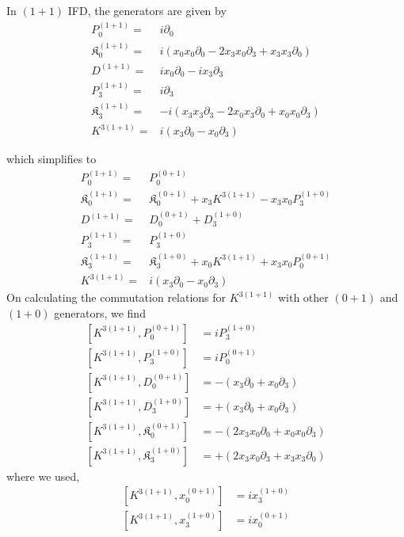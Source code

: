 \documentclass[]{article}
\numberwithin{equation}{section}
\begin{document}
{{In  $(1+1)$ IFD, the generators are given by
\begin{align}
    P^{(1+1)}_{0}=&i\partial_{0}\\
    \mathfrak{K}^{(1+1)}_{{0}}=&i(x_{0}x_{0}\partial_{{0}}-2x_{3}x_{0}\partial_{3}+x_{3}x_{3}\partial_{0})\\
    D^{(1+1)}=&ix_{0}\partial_{0}-ix_{3}\partial_{3}\\
    P^{(1+1)}_{3}=&i\partial_{3}\\
    \mathfrak{K}^{(1+1)}_{{3}}=&-i(x_{3}x_{3}\partial_{{3}}-2x_{0}x_{3}\partial_{0}+x_{0}x_{0}\partial_{3})\\
    K^{3(1+1)}=&i(x_{3}\partial_{0}-x_{0}\partial_{3})
\end{align}

which simplifies to
\begin{align}
    P^{(1+1)}_{0}=&P^{(0+1)}_{0}\\
    \mathfrak{K}^{(1+1)}_{{0}}=&\mathfrak{K}^{(0+1)}_{{0}}+x_{3}K^{3(1+1)}-x_{3}x_{0}P^{(1+0)}_{3}\\
    D^{(1+1)}=&D^{(0+1)}_{0}+D^{(1+0)}_{3}\\
    P^{(1+1)}_{3}=&P^{(1+0)}_{3}\\
    \mathfrak{K}^{(1+1)}_{{3}}=&\mathfrak{K}^{(1+0)}_{{3}}+x_{0}K^{3(1+1)}+x_{3}x_{0}P^{(0+1)}_{0}\\
    K^{3(1+1)}=&i(x_{3}\partial_{0}-x_{0}\partial_{3})
\end{align}
On calculating the commutation relations for $K^{3(1+1)}$ with other $(0+1)$ and $(1+0)$ generators, we find
\begin{align}
    \left[K^{3(1+1)}, P^{(0+1)}_{0}\right] &= iP^{(1+0)}_{3}\\
    \left[K^{3(1+1)}, P^{(1+0)}_{3}\right] &= iP^{(0+1)}_{0}\\
    \left[K^{3(1+1)}, D^{(0+1)}_{0}\right] &=-(x_{3}\partial_{0}+x_{0}\partial_{3})\\
    \left[K^{3(1+1)}, D^{(1+0)}_{3}\right] &=+(x_{3}\partial_{0}+x_{0}\partial_{3})\\
    \left[K^{3(1+1)}, \mathfrak{K}^{(0+1)}_{0}\right] &=-(2x_{3}x_{0}\partial_{0}+x_{0}x_{0}\partial_{3})\\
    \left[K^{3(1+1)}, \mathfrak{K}^{(1+0)}_{3}\right] &=+(2x_{3}x_{0}\partial_{3}+x_{3}x_{3}\partial_{0})
\end{align}
where we used,
\begin{align}
    \left[K^{3(1+1)}, x^{(0+1)}_{0}\right] &= ix^{(1+0)}_{3}\\
    \left[K^{3(1+1)}, x^{(1+0)}_{3}\right] &= ix^{(0+1)}_{0}

\end{align}}}
\end{document}
